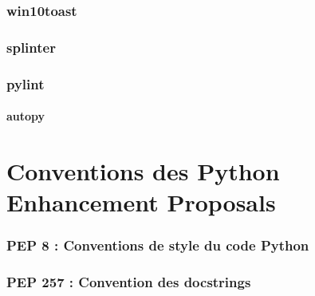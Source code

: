 \documentclass[a4paper, 10pt]{article}
\begin{document}
\section{win10toast}
\section{splinter}
\section{pylint}

\subsection{autopy}

\part{Conventions des Python Enhancement Proposals}
\section{PEP 8 : Conventions de style du code Python}
\section{PEP 257 : Convention des docstrings}



\printindex
\end{document}
